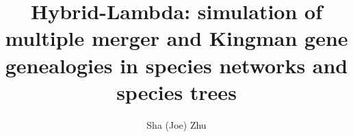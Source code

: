 \documentclass[12pt]{article}
\begin{document}
\title{Hybrid-Lambda: simulation of multiple merger and Kingman gene genealogies in species networks and species trees}
\author{Sha (Joe) Zhu}
\maketitle



\end{document}

